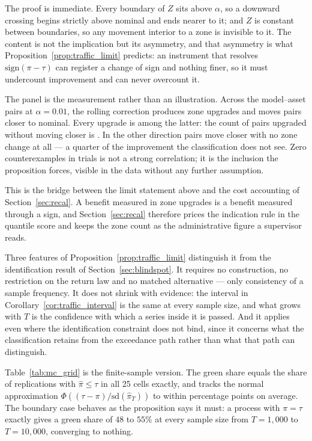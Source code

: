 The proof is immediate. Every boundary of $Z$ sits above $\alpha$, so a downward
crossing begins strictly above nominal and ends nearer to it; and $Z$ is constant
between boundaries, so any movement interior to a zone is invisible to it. The
content is not the implication but its asymmetry, and that asymmetry is what
Proposition~\ref{prop:traffic_limit} predicts: an instrument that resolves
$\mathrm{sign}(\pi - \tau)$ can register a change of sign and nothing finer, so it
must undercount improvement and can never overcount it.

The panel is the measurement rather than an illustration. Across the
\nZoneCells{} model--asset pairs at $\alpha = 0.01$, the rolling correction
produces \nZoneUpgrades{} zone upgrades and moves \nZoneCloser{} pairs closer to
nominal. Every upgrade is among the latter: the count of pairs upgraded without
moving closer is \nZoneUpNotCloser{}. In the other direction \nZoneCloserNotUp{}
pairs move closer with no zone change at all --- a quarter of the improvement the
classification does not see. Zero counterexamples in \nZoneUpgrades{} trials is
not a strong correlation; it is the inclusion the proposition forces, visible in
the data without any further assumption.

This is the bridge between the limit statement above and the cost accounting of
Section~\ref{sec:recal}. A benefit measured in zone upgrades is a benefit
measured through a sign, and Section~\ref{sec:recal} therefore prices the
indication rule in the quantile score and keeps the zone count as the
administrative figure a supervisor reads.

Three features of Proposition~\ref{prop:traffic_limit} distinguish it from the
identification result of Section~\ref{sec:blindspot}. It requires no construction,
no restriction on the return law and no matched alternative --- only consistency
of a sample frequency. It does not shrink with evidence: the interval in
Corollary~\ref{cor:traffic_interval} is the same at every sample size, and what
grows with $T$ is the confidence with which a series inside it is passed. And it
applies even where the identification constraint does not bind, since it concerns
what the classification retains from the exceedance path rather than what that
path can distinguish.

Table~\ref{tab:mc_grid} is the finite-sample version. The green share equals the
share of replications with $\hat\pi\le\tau$ in all 25 cells exactly, and tracks
the normal approximation
$\Phi\!\left((\tau-\pi)/\mathrm{sd}(\hat\pi_T)\right)$ to within \nMCNormalApproxPP{} percentage points on average. The boundary case behaves as the proposition says it must: a
process with $\pi = \tau$ exactly gives a green share of $48$ to $55$\% at every
sample size from $T = 1{,}000$ to $T = 10{,}000$, converging to nothing.

